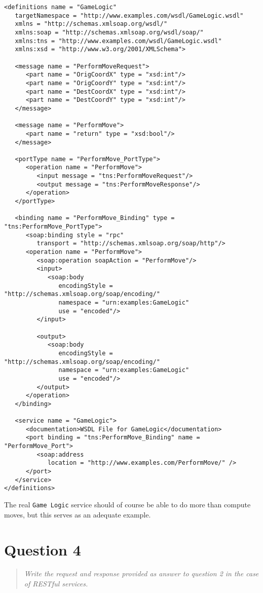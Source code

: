 \documentclass[10pt,a4paper]{report}
\begin{document}
\begin{lstlisting}[caption="WSDL representation of Game Logic service", label={lst:wsdl-game-logic}]
<definitions name = "GameLogic"
   targetNamespace = "http://www.examples.com/wsdl/GameLogic.wsdl"
   xmlns = "http://schemas.xmlsoap.org/wsdl/"
   xmlns:soap = "http://schemas.xmlsoap.org/wsdl/soap/"
   xmlns:tns = "http://www.examples.com/wsdl/GameLogic.wsdl"
   xmlns:xsd = "http://www.w3.org/2001/XMLSchema">
 
   <message name = "PerformMoveRequest">
      <part name = "OrigCoordX" type = "xsd:int"/>
      <part name = "OrigCoordY" type = "xsd:int"/>
      <part name = "DestCoordX" type = "xsd:int"/>
      <part name = "DestCoordY" type = "xsd:int"/>
   </message>
	
   <message name = "PerformMove">
      <part name = "return" type = "xsd:bool"/>
   </message>

   <portType name = "PerformMove_PortType">
      <operation name = "PerformMove">
         <input message = "tns:PerformMoveRequest"/>
         <output message = "tns:PerformMoveResponse"/>
      </operation>
   </portType>

   <binding name = "PerformMove_Binding" type = "tns:PerformMove_PortType">
      <soap:binding style = "rpc"
         transport = "http://schemas.xmlsoap.org/soap/http"/>
      <operation name = "PerformMove">
         <soap:operation soapAction = "PerformMove"/>
         <input>
            <soap:body
               encodingStyle = "http://schemas.xmlsoap.org/soap/encoding/"
               namespace = "urn:examples:GameLogic"
               use = "encoded"/>
         </input>
		
         <output>
            <soap:body
               encodingStyle = "http://schemas.xmlsoap.org/soap/encoding/"
               namespace = "urn:examples:GameLogic"
               use = "encoded"/>
         </output>
      </operation>
   </binding>

   <service name = "GameLogic">
      <documentation>WSDL File for GameLogic</documentation>
      <port binding = "tns:PerformMove_Binding" name = "PerformMove_Port">
         <soap:address
            location = "http://www.examples.com/PerformMove/" />
      </port>
   </service>
</definitions>
\end{lstlisting}

The real \texttt{Game Logic} service should of course be able to do more than compute moves, but this serves as an adequate example.

\section{Question 4}
\begin{quote}
\textit{Write the request and response provided as answer to question 2 in the case of RESTful services.}
\end{quote}
\end{document}
